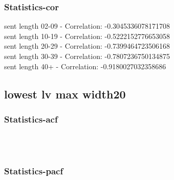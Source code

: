\documentclass{article}%
\begin{document}
%
\newpage%
\subsubsection{Statistics{-}cor}%
\label{ssubsec:Statistics{-}cor}%
\noindent%
sent length 02-09 - Correlation: -0.3045336078171708\\%
sent length 10-19 - Correlation: -0.5222152776653058\\%
sent length 20-29 - Correlation: -0.7399464723506168\\%
sent length 30-39 - Correlation: -0.7807236750134875\\%
sent length 40+ - Correlation: -0.9180027032358686\\

%
\newpage

%
\subsection{lowest lv max width20}%
\label{subsec:lowestlvmaxwidth20}%
\subsubsection{Statistics{-}acf}%
\label{ssubsec:Statistics{-}acf}%


\begin{figure}[ht]%
\centering%
\setlength{\abovecaptionskip}{-35pt}%
%
%
\\%
%
%
\\%
%
\end{figure}

%
\newpage%
\subsubsection{Statistics{-}pacf}%
\label{ssubsec:Statistics{-}pacf}%
\end{document}

